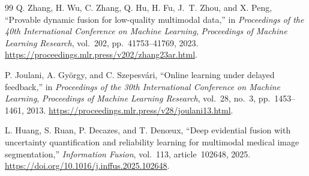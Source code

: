 \documentclass[10pt]{article}
\begin{document}
\begin{thebibliography}{99}
Q. Zhang, H. Wu, C. Zhang, Q. Hu, H. Fu, J.~T. Zhou, and X. Peng,
``Provable dynamic fusion for low-quality multimodal data,''
in \emph{Proceedings of the 40th International Conference on Machine Learning},
\emph{Proceedings of Machine Learning Research},
vol.~202, pp.~41753--41769, 2023.
\url{https://proceedings.mlr.press/v202/zhang23ar.html}.

P. Joulani, A. Gy{\"o}rgy, and C. Szepesv{\'a}ri,
``Online learning under delayed feedback,''
in \emph{Proceedings of the 30th International Conference on Machine Learning},
\emph{Proceedings of Machine Learning Research},
vol.~28, no.~3, pp.~1453--1461, 2013.
\url{https://proceedings.mlr.press/v28/joulani13.html}.

L. Huang, S. Ruan, P. Decazes, and T. Den{\oe}ux,
``Deep evidential fusion with uncertainty quantification and reliability
learning for multimodal medical image segmentation,''
\emph{Information Fusion}, vol.~113, article~102648, 2025.
\url{https://doi.org/10.1016/j.inffus.2025.102648}.

\end{thebibliography}
\end{document}
